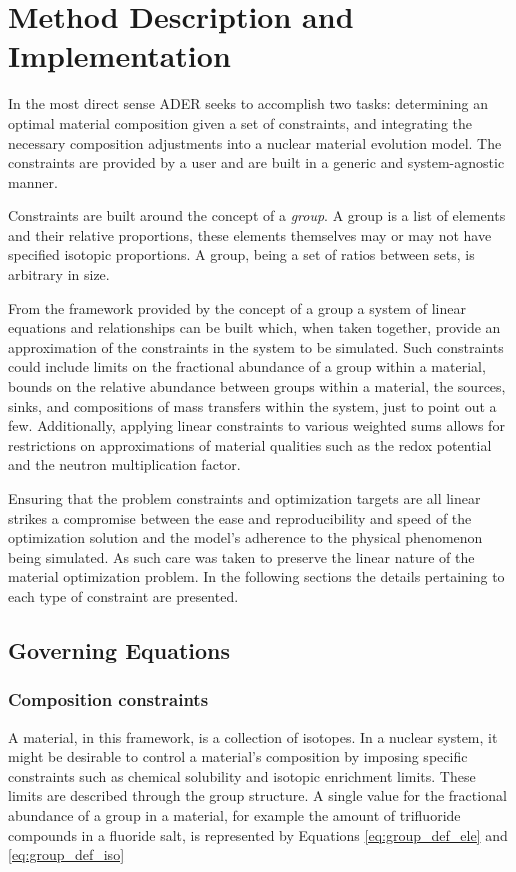 \chapter{Method Description and Implementation}
\label{ch:method}

In the most direct sense ADER seeks to accomplish two tasks: 
determining an optimal material composition given a set of constraints, 
and integrating the necessary composition adjustments into a nuclear 
material evolution model. The
constraints are provided by a user and are built in a generic and
system-agnostic manner.

Constraints are built around the concept of a \textit{group}. 
A group is a list of elements and their relative proportions,
these elements themselves may or may not have specified isotopic proportions. 
A group, being a set of ratios between sets, is arbitrary in size.

From the framework provided by the concept of a group a system of 
linear equations and relationships can be built which, when taken together, 
provide an approximation of the constraints in the system to be simulated. Such
constraints could include limits on the fractional abundance of a group within
a material, bounds on the  relative abundance between groups within a material, 
the sources, sinks, and compositions of mass transfers within
the system, just to point out a few. 
Additionally, applying linear constraints to various weighted sums allows for
restrictions on approximations of material qualities such as the redox 
potential and the neutron multiplication factor. 

Ensuring that the problem constraints and optimization targets are all linear 
strikes a compromise between the ease and reproducibility and speed of the 
optimization  solution and the model's adherence to the physical phenomenon
being simulated. 
As such care was taken to preserve the linear nature of the material 
optimization problem. In the following sections the details pertaining to each
type of constraint are presented.

\section{Governing Equations} \label{sec:equations}
\subsection{Composition constraints} \label{ssec:group_eq}
A material, in this framework, is a collection of isotopes. In a nuclear 
system, it might be desirable to control a material's  composition by imposing 
specific constraints such as chemical solubility and isotopic enrichment limits.
These limits are described through the group structure. A single value for 
the fractional abundance of a group in
a material, for example the amount of trifluoride compounds in a fluoride 
salt, is represented by Equations
\ref{eq:group_def_ele} and \ref{eq:group_def_iso}

